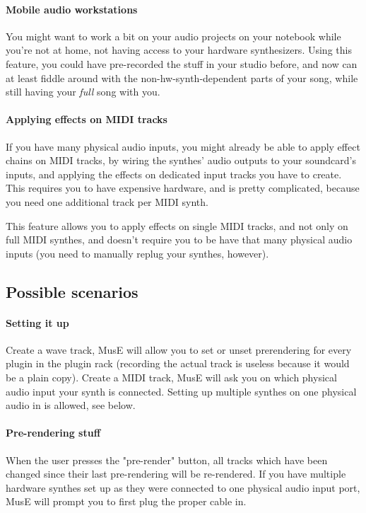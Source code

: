 \documentclass[a4paper]{report}
\begin{document}
\paragraph{Mobile audio workstations}
You might want to work a bit on your audio projects on your notebook
while you're not at home, not having access to your hardware synthesizers.
Using this feature, you could have pre-recorded the stuff in your studio
before, and now can at least fiddle around with the non-hw-synth-dependent
parts of your song, while still having your \emph{full} song with you.

\paragraph{Applying effects on MIDI tracks}
If you have many physical audio inputs, you might already be able to
apply effect chains on MIDI tracks, by wiring the synthes' audio
outputs to your soundcard's inputs, and applying the effects on
dedicated input tracks you have to create. This requires you to have
expensive hardware, and is pretty complicated, because you need one
additional track per MIDI synth.

This feature allows you to apply effects on single MIDI tracks, and not
only on full MIDI synthes, and doesn't require you to be have that
many physical audio inputs (you need to manually replug your synthes,
however).

\subsection{Possible scenarios}
\paragraph{Setting it up}
Create a wave track, MusE will allow you to set or unset prerendering
for every plugin in the plugin rack (recording the actual track is
useless because it would be a plain copy).
Create a MIDI track, MusE will ask you on which physical audio input
your synth is connected. Setting up multiple synthes on one physical 
audio in is allowed, see below.

\paragraph{Pre-rendering stuff}
When the user presses the "pre-render" button, all tracks which have
been changed since their last pre-rendering will be re-rendered.
If you have multiple hardware synthes set up as they were connected
to one physical audio input port, MusE will prompt you to first plug
the proper cable in.
\end{document}
